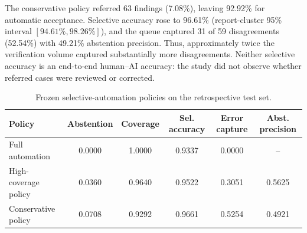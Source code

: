 \documentclass[11pt]{article}
\begin{document}
The conservative policy referred 63 findings (7.08\%), leaving 92.92\% for
automatic acceptance. Selective accuracy rose to 96.61\% (report-cluster 95\%
interval $[94.61\%,98.26\%]$), and the queue captured 31 of 59 disagreements
(52.54\%) with 49.21\% abstention precision. Thus, approximately twice the
verification volume captured substantially more disagreements. Neither
selective accuracy is an end-to-end human--AI accuracy: the study did not observe
whether referred cases were reviewed or corrected.

\begin{table}[t]
  \centering
  \caption{Frozen selective-automation policies on the retrospective test set.}
  \label{tab:operating-points}
  \begin{tabular}{lccccc}
    \toprule
    Policy & Abstention & Coverage & Sel. accuracy & Error capture & Abst. precision \\
    \midrule
    Full automation & 0.0000 & 1.0000 & 0.9337 & 0.0000 & -- \\
    High-coverage policy & 0.0360 & 0.9640 & 0.9522 & 0.3051 & 0.5625 \\
    Conservative policy & 0.0708 & 0.9292 & 0.9661 & 0.5254 & 0.4921 \\
    \bottomrule
  \end{tabular}
\end{table}
\end{document}
